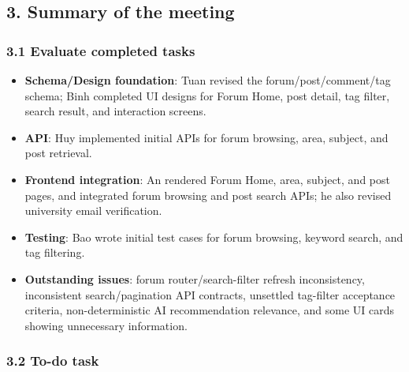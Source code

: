 \documentclass[12pt]{article}
\begin{document}
\subsection{3. Summary of the meeting}

\subsubsection{3.1 Evaluate completed tasks}

\begin{itemize}

\item \textbf{Schema/Design foundation}: Tuan revised the forum/post/comment/tag schema; Binh completed UI designs for Forum Home, post detail, tag filter, search result, and interaction screens.

\item \textbf{API}: Huy implemented initial APIs for forum browsing, area, subject, and post retrieval.

\item \textbf{Frontend integration}: An rendered Forum Home, area, subject, and post pages, and integrated forum browsing and post search APIs; he also revised university email verification.

\item \textbf{Testing}: Bao wrote initial test cases for forum browsing, keyword search, and tag filtering.

\item \textbf{Outstanding issues}: forum router/search-filter refresh inconsistency, inconsistent search/pagination API contracts, unsettled tag-filter acceptance criteria, non-deterministic AI recommendation relevance, and some UI cards showing unnecessary information.

\end{itemize}

\subsubsection{3.2 To-do task}
\end{document}
